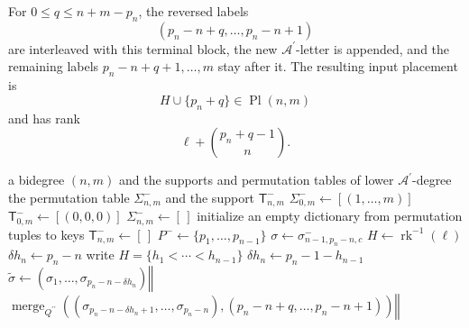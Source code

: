\documentclass{amsart}
\theoremstyle{definition}
\theoremstyle{remark}
\begin{document}
For $0\leq q\leq n+m-p_n$, the reversed labels
\[
    (p_n-n+q,\ldots,p_n-n+1)
\]
are interleaved with this terminal block, the new
$\mathcal{A}^{\prime}$-letter is appended, and the remaining labels
$p_n-n+q+1,\ldots,m$ stay after it. The resulting input placement is
\[
    H\cup\{p_n+q\}
    \in
    \operatorname{Pl}(n,m)
\]
and has rank
\[
    \ell+\binom{p_n+q-1}{n}.
\]

\begin{algorithm}[ht]
\caption{Sparse support for $\Psi^{-1}$}
\label{alg:psi_inverse_support}
\begin{algorithmic}[1]
\Require a bidegree $(n,m)$ and the supports and permutation tables of
lower $\mathcal{A}^{\prime}$-degree
\Ensure the permutation table $\Sigma^{-}_{n,m}$ and the support
$\mathsf{T}^{-}_{n,m}$
    \State
    $\Sigma^{-}_{0,m}\gets[(1,\ldots,m)]$
    \State
    $\mathsf{T}^{-}_{0,m}\gets[(0,0,0)]$
\Else
    \State $\Sigma^{-}_{n,m}\gets[\,]$
    \State initialize an empty dictionary from permutation tuples to keys
    \State $\mathsf{T}^{-}_{n,m}\gets[\,]$
        \State
        $P^{-}\gets\{p_1,\ldots,p_{n-1}\}$
            \State
            $\sigma\gets\sigma^{-}_{n-1,p_n-n,c}$
            \State
            $H\gets\operatorname{rk}^{-1}(\ell)$
                \State
                $\delta h_n\gets p_n-n$
            \Else
                \State
                write $H=\{h_1<\cdots<h_{n-1}\}$
                \State
                $\delta h_n\gets p_n-1-h_{n-1}$
            \EndIf
                    \State
                    $\widetilde{\sigma}
                    \gets
                    (\sigma_1,\ldots,
                    \sigma_{p_n-n-\delta h_n})
                    \mathbin{\Vert}$
                    \Statex \hspace{2.6em}
                    $\operatorname{merge}_{Q^{\prime\prime}}
                    \left(
                        (\sigma_{p_n-n-\delta h_n+1},\ldots,
                        \sigma_{p_n-n}),
                        (p_n-n+q,\ldots,p_n-n+1)
                    \right)
                    \mathbin{\Vert}$
                    \Statex \hspace{2.6em}

\end{algorithmic}
\end{algorithm}
\end{document}
